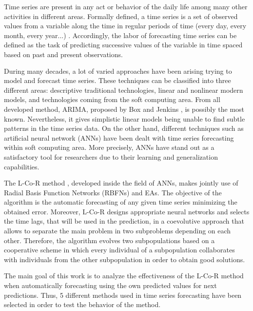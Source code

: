 \documentclass[a4paper,twoside]{article}
\newcommand{\metodo}{L-Co-R}
\begin{document}
\noindent Time series are present in any act or behavior of the daily life among many other activities in different areas. %
Formally defined, a time series is a set of observed values from a variable along the time in regular periods of time (every day, every month, every year...) \cite{Pena2005}. Accordingly, the labor of forecasting time series can be defined as the task of predicting successive values of the variable in time spaced based on past and present observations.

During many decades, a lot of varied approaches have been arising trying to model and forecast time series. These techniques can be classified into three different areas: descriptive traditional technologies, linear and nonlinear modern models, and technologies coming from the soft computing area. From all developed method, ARIMA, proposed by Box and Jenkins \cite{BoxJenk}, is possibly the most known. %
Nevertheless, it gives simplistic linear models %
being unable to find subtle patterns in the time series data. On the other hand, different techniques such as %
artificial neural network (ANNs) have been dealt with time series forecasting within soft computing area. More precisely, ANNs have stand out as a satisfactory tool for researchers due to their learning and generalization capabilities.

The {\metodo} method \cite{Parras2012Softcomputing}, developed inside the field of ANNs, makes jointly use of Radial Basis Function Networks (RBFNs) and EAs. The objective of the algorithm is the automatic forecasting of any given time series minimizing the obtained error. Moreover, {\metodo} designs appropriate neural networks and selects the time lags, that will be used in the prediction, in a coevolutive \cite{Paredis95} approach that allows to separate the main problem in two subproblems depending on each other. Therefore, the algorithm evolves two subpopulations based on a cooperative scheme in which every individual of a subpopulation collaborates with individuals from the other subpopulation in order to obtain good solutions.

The main goal of this work is to analyze the effectiveness of the {\metodo} method when automatically forecasting using the own predicted values for next predictions. Thus, 5 different methods used in time series forecasting have been selected in order to test the behavior of the method.
\end{document}
